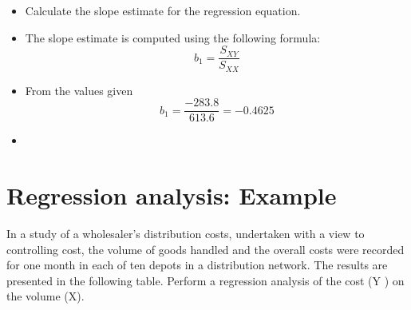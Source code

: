 \documentclass[]{report}
\begin{document}

















\begin{itemize}
	\item Calculate the slope estimate for the regression equation.
	\item The slope estimate is computed using the following formula:
	\[ b_1 = \frac{S_{XY}}{S_{XX}} \]
	\item From the values given
	\[ b_1 = \frac{-283.8}{613.6} =-0.4625 \]
	\item 
\end{itemize}




\newpage

\section{Regression analysis: Example}
In a study of a wholesaler’s distribution costs, undertaken with a view to controlling cost, the volume of goods handled and the overall costs were recorded for one month in each of ten depots in a distribution network. The results are presented in the following table. Perform a regression analysis of the cost (Y ) on the volume (X).


\end{document}
